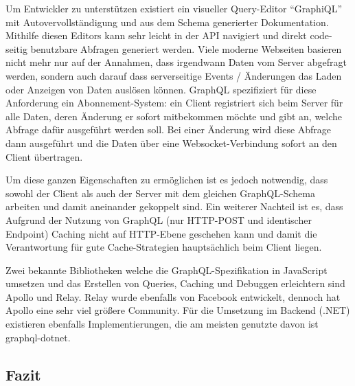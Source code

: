 

Um Entwickler zu unterstützen existiert ein visueller Query-Editor ``GraphiQL'' mit Autovervollständigung und aus dem Schema generierter Dokumentation. Mithilfe diesen Editors kann sehr leicht in der API navigiert und direkt code-seitig benutzbare Abfragen generiert werden.
Viele moderne Webseiten basieren nicht mehr nur auf der Annahmen, dass irgendwann Daten vom Server abgefragt werden, sondern auch darauf dass serverseitige Events / Änderungen das Laden oder Anzeigen von Daten auslösen können. GraphQL spezifiziert für diese Anforderung ein Abonnement-System: ein Client registriert sich beim Server für alle Daten, deren Änderung er sofort mitbekommen möchte und gibt an, welche Abfrage dafür ausgeführt werden soll. Bei einer Änderung wird diese Abfrage dann ausgeführt und die Daten über eine Websocket-Verbindung sofort an den Client übertragen.

Um diese ganzen Eigenschaften zu ermöglichen ist es jedoch notwendig, dass sowohl der Client als auch der Server mit dem gleichen GraphQL-Schema arbeiten und damit aneinander gekoppelt sind.
Ein weiterer Nachteil ist es, dass Aufgrund der Nutzung von GraphQL (nur HTTP-POST und identischer Endpoint) Caching nicht auf HTTP-Ebene geschehen kann und damit die Verantwortung für gute Cache-Strategien hauptsächlich beim Client liegen.

Zwei bekannte Bibliotheken welche die GraphQL-Spezifikation in JavaScript umsetzen und das Erstellen von Queries, Caching und Debuggen erleichtern sind Apollo und Relay. Relay wurde ebenfalls von Facebook entwickelt, dennoch hat Apollo eine sehr viel größere Community. Für die Umsetzung im Backend (.NET) existieren ebenfalls Implementierungen, die am meisten genutzte davon ist graphql-dotnet.

\subsection{Fazit}

